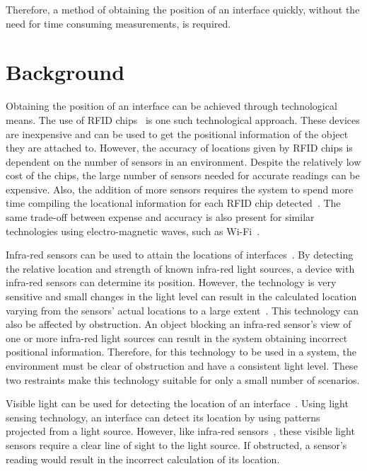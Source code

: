 \documentclass{bmcart}
\begin{document}
Therefore, a method of obtaining the position of an interface quickly, without the need for time consuming measurements, is required.


\section*{Background}\label{sec:related}

Obtaining the position of an interface can be achieved through technological means.
The use of RFID chips~\cite{Ni2004} is one such technological approach.
These devices are inexpensive and can be used to get the positional information of the object they are attached to.
However, the accuracy of locations given by RFID chips is dependent on the number of sensors in an environment.
Despite the relatively low cost of the chips, the large number of sensors needed for accurate readings can be expensive.
Also, the addition of more sensors requires the system to spend more time compiling the locational information for each RFID chip detected~\cite{Ni2004}.
The same trade-off between expense and accuracy is also present for similar technologies using electro-magnetic waves, such as Wi-Fi~\cite{Cheng2005}.

Infra-red sensors can be used to attain the locations of interfaces~\cite{Kortuem2005}.
By detecting the relative location and strength of known infra-red light sources, a device with infra-red sensors can determine its position.
However, the technology is very sensitive and small changes in the light level can result in the calculated location varying from the sensors' actual locations to a large extent~\cite{Kortuem2005}.
This technology can also be affected by obstruction.
An object blocking an infra-red sensor's view of one or more infra-red light sources can result in the system obtaining incorrect positional information.
Therefore, for this technology to be used in a system, the environment must be clear of obstruction and have a consistent light level.
These two restraints make this technology suitable for only a small number of scenarios.

Visible light can be used for detecting the location of an interface~\cite{Lee2004}.
Using light sensing technology, an interface can detect its location by using patterns projected from a light source.
However, like infra-red sensors~\cite{Kortuem2005}, these visible light sensors require a clear line of sight to the light source.
If obstructed, a sensor's reading would result in the incorrect calculation of its location.
\end{document}

